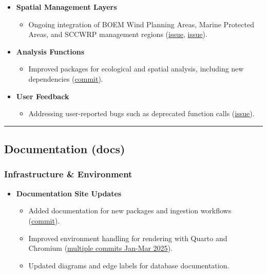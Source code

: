 \documentclass[
  letterpaper,
  DIV=11,
  numbers=noendperiod]{scrreprt}
\providecommand{\tightlist}{%
  \setlength{\itemsep}{0pt}\setlength{\parskip}{0pt}}
\begin{document}
\begin{itemize}
\tightlist
\item
  \textbf{Spatial Management Layers}

  \begin{itemize}
  \tightlist
  \item
    Ongoing integration of BOEM Wind Planning Areas, Marine Protected
    Areas, and SCCWRP management regions
    (\href{https://github.com/CalCOFI/calcofi4r/issues/8}{issue},
    \href{https://github.com/CalCOFI/calcofi4r/issues/7}{issue}).
  \end{itemize}
\item
  \textbf{Analysis Functions}

  \begin{itemize}
  \tightlist
  \item
    Improved packages for ecological and spatial analysis, including new
    dependencies
    (\href{https://github.com/CalCOFI/calcofi4r/commit/c17243ae92eb0968bb0666ce4ee6101e88488e73}{commit}).
  \end{itemize}
\item
  \textbf{User Feedback}

  \begin{itemize}
  \tightlist
  \item
    Addressing user-reported bugs such as deprecated function calls
    (\href{https://github.com/CalCOFI/calcofi4r/issues/9}{issue}).
  \end{itemize}
\end{itemize}

\begin{center}\rule{0.5\linewidth}{0.5pt}\end{center}

\subsection{Documentation (docs)}\label{documentation-docs}

\subsubsection{Infrastructure \&
Environment}\label{infrastructure-environment}

\begin{itemize}
\tightlist
\item
  \textbf{Documentation Site Updates}

  \begin{itemize}
  \tightlist
  \item
    Added documentation for new packages and ingestion workflows
    (\href{https://github.com/CalCOFI/docs/commit/b350cec3bd3afda0dad0cbc48c8d223fa1956641}{commit}).
  \item
    Improved environment handling for rendering with Quarto and Chromium
    (\href{https://github.com/CalCOFI/docs/commits}{multiple commits
    Jan-Mar 2025}).
  \item
    Updated diagrams and edge labels for database documentation.
  \end{itemize}
\end{itemize}
\end{document}
